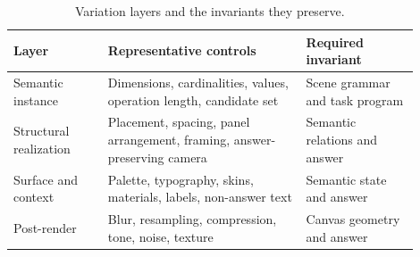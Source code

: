 \begin{table}[t]
  \centering
  \scriptsize
  \setlength{\tabcolsep}{3.5pt}
  \renewcommand{\arraystretch}{1.02}
  \caption{Variation layers and the invariants they preserve.}
  \label{tab:variation-layers}
  \begin{tabular}{@{}>{\raggedright\arraybackslash}p{0.21\linewidth}
                       >{\raggedright\arraybackslash}p{0.44\linewidth}
                       >{\raggedright\arraybackslash}p{0.25\linewidth}@{}}
    \toprule
    Layer & Representative controls & Required invariant \\
    \midrule
    Semantic instance
      & Dimensions, cardinalities, values, operation length, candidate set
      & Scene grammar and task program \\
    Structural realization
      & Placement, spacing, panel arrangement, framing, answer-preserving camera
      & Semantic relations and answer \\
    Surface and context
      & Palette, typography, skins, materials, labels, non-answer text
      & Semantic state and answer \\
    Post-render
      & Blur, resampling, compression, tone, noise, texture
      & Canvas geometry and answer \\
    \bottomrule
  \end{tabular}
\end{table}

